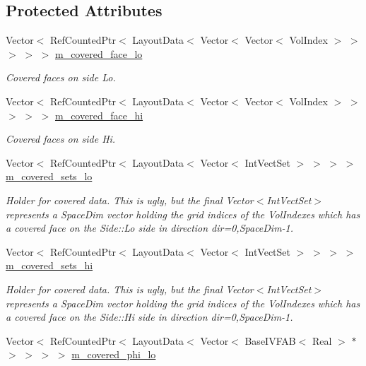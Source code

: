 \subsection*{Protected Attributes}
\begin{DoxyCompactItemize}
\item 
Vector$<$ Ref\+Counted\+Ptr$<$ Layout\+Data$<$ Vector$<$ Vector$<$ Vol\+Index $>$ $>$ $>$ $>$ $>$ \hyperlink{classcdr__gdnv_a527bf07c01ec86d8c70236f41d034877}{m\+\_\+covered\+\_\+face\+\_\+lo}
\begin{DoxyCompactList}\small\item\em Covered faces on side Lo. \end{DoxyCompactList}\item 
Vector$<$ Ref\+Counted\+Ptr$<$ Layout\+Data$<$ Vector$<$ Vector$<$ Vol\+Index $>$ $>$ $>$ $>$ $>$ \hyperlink{classcdr__gdnv_ab8e1a335582c15a0914ab0fde973659e}{m\+\_\+covered\+\_\+face\+\_\+hi}
\begin{DoxyCompactList}\small\item\em Covered faces on side Hi. \end{DoxyCompactList}\item 
Vector$<$ Ref\+Counted\+Ptr$<$ Layout\+Data$<$ Vector$<$ Int\+Vect\+Set $>$ $>$ $>$ $>$ \hyperlink{classcdr__gdnv_a39304f0c4be896ed71116bc936e485ad}{m\+\_\+covered\+\_\+sets\+\_\+lo}
\begin{DoxyCompactList}\small\item\em Holder for covered data. This is ugly, but the final Vector$<$\+Int\+Vect\+Set$>$ represents a Space\+Dim vector holding the grid indices of the Vol\+Indexes which has a covered face on the Side\+::\+Lo side in direction dir=0,Space\+Dim-\/1. \end{DoxyCompactList}\item 
Vector$<$ Ref\+Counted\+Ptr$<$ Layout\+Data$<$ Vector$<$ Int\+Vect\+Set $>$ $>$ $>$ $>$ \hyperlink{classcdr__gdnv_a0b6f89620dc409d80c4decb394854b83}{m\+\_\+covered\+\_\+sets\+\_\+hi}
\begin{DoxyCompactList}\small\item\em Holder for covered data. This is ugly, but the final Vector$<$\+Int\+Vect\+Set$>$ represents a Space\+Dim vector holding the grid indices of the Vol\+Indexes which has a covered face on the Side\+::\+Hi side in direction dir=0,Space\+Dim-\/1. \end{DoxyCompactList}\item 
Vector$<$ Ref\+Counted\+Ptr$<$ Layout\+Data$<$ Vector$<$ Base\+I\+V\+F\+AB$<$ Real $>$ $\ast$ $>$ $>$ $>$ $>$ \hyperlink{classcdr__gdnv_ad190c064e236d67f2ba30983f58e7deb}{m\+\_\+covered\+\_\+phi\+\_\+lo}

\end{DoxyCompactItemize}
